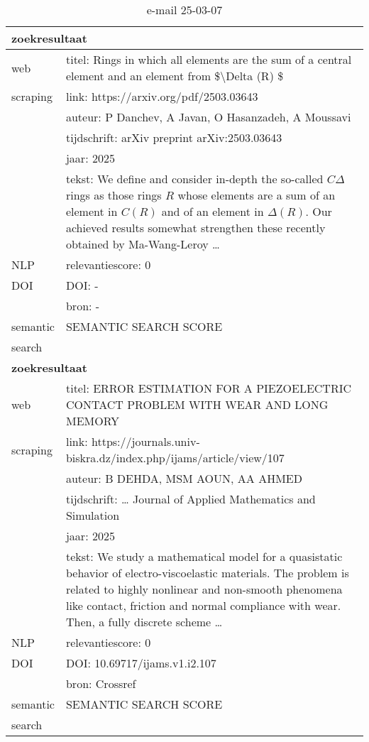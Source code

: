 \begin{table}[h!]
    \caption{e-mail 25-03-07}
    \centering
    \begin{tabularx}{\textwidth}{|p{4cm}|X|} 
        \hline
        \multicolumn{2}{|X|}{\textbf{zoekresultaat}} \\
        \hline
        web &titel: Rings in which all elements are the sum of a central element and an element from \$\textbackslash Delta (R) \$\\
        scraping&link: https://arxiv.org/pdf/2503.03643\\
        &auteur: P Danchev, A Javan, O Hasanzadeh, A Moussavi\\
        &tijdschrift: arXiv preprint arXiv:2503.03643\\
        &jaar: 2025\\
        &tekst: We define and consider in-depth the so-called $C\Delta$ rings as those rings $R$ whose elements are a sum of an element in $C(R)$ and of an element in $\Delta(R)$. Our achieved results somewhat strengthen these recently obtained by Ma-Wang-Leroy …\\
        \hline
        NLP&relevantiescore: 0\\
        \hline
        DOI&DOI: -\\
        &bron: -\\
        \hline
        semantic&SEMANTIC SEARCH SCORE\\
        search&\\
        \hline
        \multicolumn{2}{|X|}{\textbf{zoekresultaat}} \\
        \hline
        web &titel: ERROR ESTIMATION FOR A PIEZOELECTRIC CONTACT PROBLEM WITH WEAR AND LONG MEMORY\\
        scraping&link: https://journals.univ-biskra.dz/index.php/ijams/article/view/107\\
        &auteur: B DEHDA, MSM AOUN, AA AHMED\\
        &tijdschrift: … Journal of Applied Mathematics and Simulation\\
        &jaar: 2025\\
        &tekst: We study a mathematical model for a quasistatic behavior of electro-viscoelastic materials. The problem is related to highly nonlinear and non-smooth phenomena like contact, friction and normal compliance with wear. Then, a fully discrete scheme …\\
        \hline
        NLP&relevantiescore: 0\\
        \hline
        DOI&DOI: 10.69717/ijams.v1.i2.107\\
        &bron: Crossref\\
        \hline
        semantic&SEMANTIC SEARCH SCORE\\
        search&\\
        \hline
    \end{tabularx}
    \label{table:email20250307}
\end{table}
